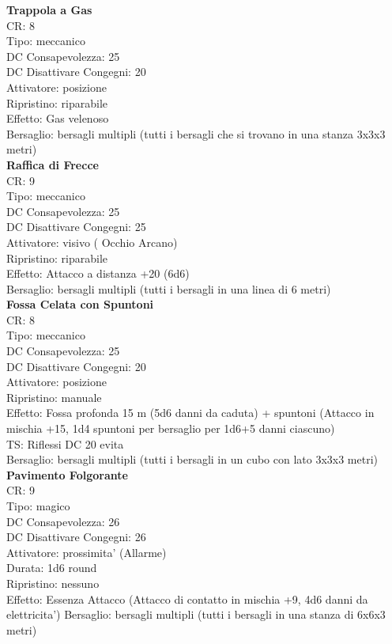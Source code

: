 \documentclass[a4paper,11pt,twoside,openany]{dndbook}
\begin{document}
\begin{multicols}{2}
\textbf{Trappola a Gas}\\
CR: 8 \\
Tipo: meccanico \\
DC Consapevolezza: 25 \\
DC Disattivare Congegni: 20 \\
Attivatore: posizione \\
Ripristino: riparabile \\
Effetto: Gas velenoso \\
Bersaglio: bersagli multipli (tutti i bersagli che si trovano in una stanza 3x3x3 metri)\\

\textbf{Raffica di Frecce}\\
CR: 9 \\
Tipo: meccanico \\
DC Consapevolezza: 25 \\
DC Disattivare Congegni: 25 \\
Attivatore: visivo ( Occhio Arcano) \\
Ripristino: riparabile \\
Effetto: Attacco a distanza +20 (6d6) \\
Bersaglio: bersagli multipli (tutti i bersagli in una linea di 6 metri)\\

\textbf{Fossa Celata con Spuntoni}\\
CR: 8 \\
Tipo: meccanico \\
DC Consapevolezza: 25 \\
DC Disattivare Congegni: 20 \\
Attivatore: posizione \\
Ripristino: manuale \\
Effetto: Fossa profonda 15 m (5d6 danni da caduta) + spuntoni (Attacco in mischia +15, 1d4 spuntoni per bersaglio per 1d6+5 danni ciascuno) \\
TS: Riflessi DC 20 evita \\
Bersaglio: bersagli multipli (tutti i bersagli in un cubo con lato 3x3x3 metri)\\

\textbf{Pavimento Folgorante}\\
CR: 9 \\
Tipo: magico \\
DC Consapevolezza: 26 \\
DC Disattivare Congegni: 26 \\
Attivatore: prossimita' (Allarme) \\
Durata: 1d6 round \\
Ripristino: nessuno \\
Effetto: Essenza Attacco (Attacco di contatto in mischia +9, 4d6 danni da elettricita') 
Bersaglio: bersagli multipli (tutti i bersagli in una stanza di 6x6x3 metri)\\


\end{multicols}
\end{document}

